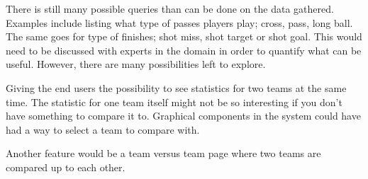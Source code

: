 There is still many possible queries than can be done on the data gathered. Examples include listing what type of passes players play; cross, pass, long ball. The same goes for type of finishes; shot miss, shot target or shot goal. This would need to be discussed with experts in the domain in order to quantify what can be useful. However, there are many possibilities left to explore. 

Giving the end users the possibility to see statistics for two teams at the same time. The statistic for one team itself might not be so interesting if you don't have something to compare it to. Graphical components in the system could have had a way to select a team to compare with.

Another feature would be a team versus team page where two teams are compared up to each other.







